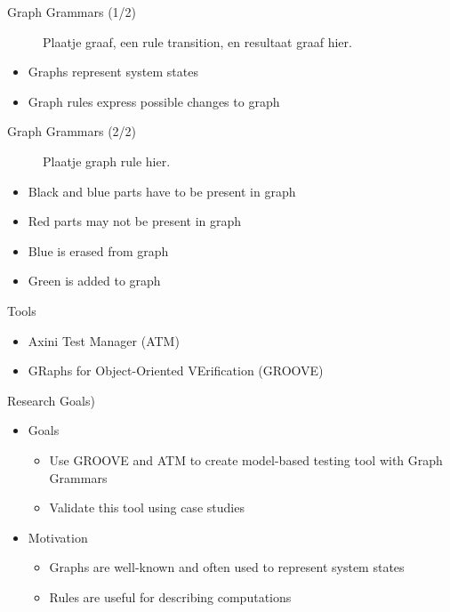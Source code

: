 \documentclass{FMTslides}
\begin{document}
\begin{frame}{Graph Grammars (1/2)}
\begin{figure}
Plaatje graaf, een rule transition, en resultaat graaf hier. %
\end{figure}
\begin{itemize}[<+->]
  \item Graphs represent system states
  \item Graph rules express possible changes to graph
\end{itemize}
\end{frame}

\begin{frame}{Graph Grammars (2/2)}
\begin{figure}
Plaatje graph rule hier. %
\end{figure}
\begin{itemize}[<+->]
  \item Black and blue parts have to be present in graph
  \item Red parts may not be present in graph
  \item Blue is erased from graph
  \item Green is added to graph
\end{itemize}
\end{frame}

\begin{frame}{Tools}
\begin{itemize}[<+->]
\item Axini Test Manager (ATM)
\item GRaphs for Object-Oriented VErification (GROOVE)
\end{itemize}
\end{frame}

\begin{frame}{Research Goals)}
\begin{itemize}[<+->]
  \item Goals
  \begin{itemize}
    \item Use GROOVE and ATM to create model-based testing tool with Graph Grammars
    \item Validate this tool using case studies
  \end{itemize}
  \item Motivation
  \begin{itemize}
    \item Graphs are well-known and often used to represent system states
    \item Rules are useful for describing computations
  \end{itemize}
\end{itemize}
\end{frame}
\end{document}

